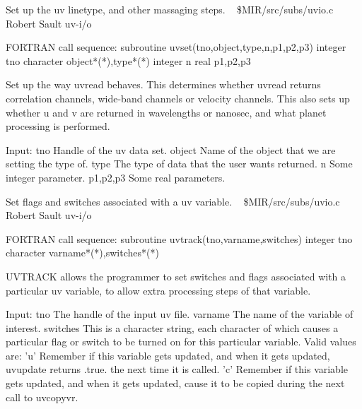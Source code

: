 %
\noindent Set up the uv linetype, and other massaging steps.
\newline \ 
\newline {} \$MIR/src/subs/uvio.c
\newline {} Robert Sault
\newline {} uv-i/o
\par{\tenpoint
{\eightpoint\begintt
FORTRAN call sequence:
        subroutine uvset(tno,object,type,n,p1,p2,p3)
        integer tno
        character object*(*),type*(*)
        integer n
        real p1,p2,p3

  Set up the way uvread behaves. This determines whether uvread returns
  correlation channels, wide-band channels or velocity channels. This also
  sets up whether u and v are returned in wavelengths or nanosec, and
  what planet processing is performed.

  Input:
    tno         Handle of the uv data set.
    object      Name of the object that we are setting the type of.
    type        The type of data that the user wants returned.
    n           Some integer parameter.
    p1,p2,p3    Some real parameters.                                   
\endtt}
\par}
%
\noindent Set flags and switches associated with a uv variable.
\newline \ 
\newline {} \$MIR/src/subs/uvio.c
\newline {} Robert Sault
\newline \abox{Keywords:} uv-i/o
\par{\tenpoint
{\eightpoint\begintt
FORTRAN call sequence:
        subroutine uvtrack(tno,varname,switches)
        integer tno
        character varname*(*),switches*(*)

  UVTRACK allows the programmer to set switches and flags associated with
  a particular uv variable, to allow extra processing steps of that
  variable.

  Input:
    tno         The handle of the input uv file.
    varname     The name of the variable of interest.
    switches    This is a character string, each character of which
                causes a particular flag or switch to be turned on for
                this particular variable. Valid values are:
                 'u'  Remember if this variable gets updated, and  when
                      it gets updated, uvupdate returns .true. the next
                      time it is called.
                 'c'  Remember if this variable gets updated, and when 
                      it gets updated, cause it to be copied during the
                      next call to uvcopyvr.                            
\endtt}
\par}
